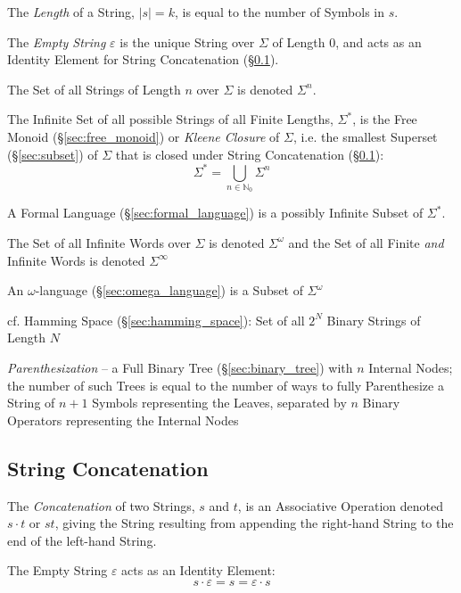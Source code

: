 The \emph{Length} of a String, $|s| = k$, is equal to the number of Symbols in
$s$.

The \emph{Empty String} $\varepsilon$ is the unique String over $\Sigma$ of
Length 0, and acts as an Identity Element for String Concatenation
(\S\ref{sec:string_concatenation}).

The Set of all Strings of Length $n$ over $\Sigma$ is denoted $\Sigma^n$.

The Infinite Set of all possible Strings of all Finite Lengths, $\Sigma^*$, is
the Free Monoid (\S\ref{sec:free_monoid}) or \emph{Kleene Closure} of $\Sigma$,
i.e. the smallest Superset (\S\ref{sec:subset}) of $\Sigma$ that is closed under
String Concatenation (\S\ref{sec:string_concatenation}):
\[
  \Sigma^* = \bigcup_{n\in\mathbb{N}_0} \Sigma^n
\]

A Formal Language (\S\ref{sec:formal_language}) is a possibly Infinite Subset of
$\Sigma^*$.

The Set of all Infinite Words over $\Sigma$ is denoted $\Sigma^\omega$ and the
Set of all Finite \emph{and} Infinite Words is denoted $\Sigma^\infty$

An $\omega$-language (\S\ref{sec:omega_language}) is a Subset of $\Sigma^\omega$

\fist cf. Hamming Space (\S\ref{sec:hamming_space}): Set of all $2^N$ Binary
Strings of Length $N$

\emph{Parenthesization} -- a Full Binary Tree (\S\ref{sec:binary_tree}) with $n$
Internal Nodes; the number of such Trees is equal to the number of ways to fully
Parenthesize a String of $n+1$ Symbols representing the Leaves, separated by $n$
Binary Operators representing the Internal Nodes



\subsection{String Concatenation}\label{sec:string_concatenation}

The \emph{Concatenation} of two Strings, $s$ and $t$, is an Associative
Operation denoted $s \cdot t$ or $st$, giving the String resulting from
appending the right-hand String to the end of the left-hand String.

The Empty String $\varepsilon$ acts as an Identity Element:
\[
  s \cdot \varepsilon = s = \varepsilon \cdot s
\]


